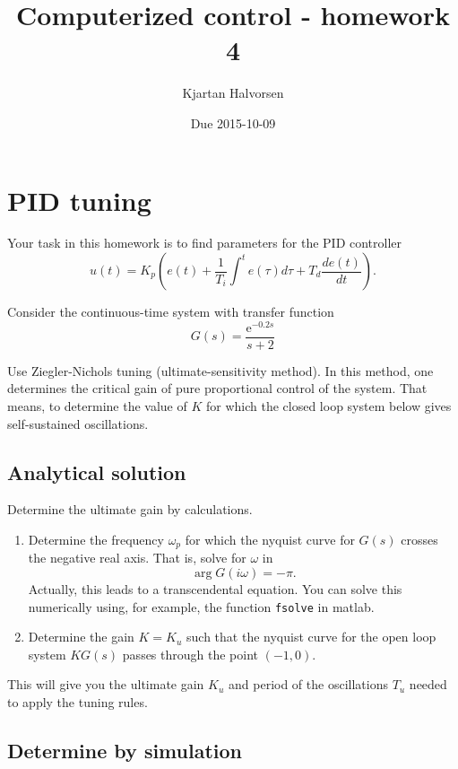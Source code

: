 \documentclass{scrartcl}
\title{Computerized control - homework 4}
\author{Kjartan Halvorsen}
\date{Due 2015-10-09}
\newcommand*{\mexp}[1]{\ensuremath{\mathrm{e}^{#1}}}
\begin{document}
\maketitle


\section{PID tuning}
\label{sec-1}

  Your task in this homework is to find parameters for the PID controller 
  \[ u(t) = K_p\left(e(t) + \frac{1}{T_i}\int^te(\tau)d\tau + T_d\frac{de(t)}{dt} \right). \]

  Consider the continuous-time system with transfer function
  \[ G(s) = \frac{\mexp{-0.2s}}{s+2} \]
  
  Use Ziegler-Nichols tuning (ultimate-sensitivity method). In this method, one determines the critical gain of pure proportional control of the system. That means, to determine the value of $K$ for which the closed loop system below gives self-sustained oscillations.
  \begin{center}
  
  \end{center}
\subsection{Analytical solution}
\label{sec-1-1}

  Determine the ultimate gain by calculations. 
\begin{enumerate}
\item Determine the frequency $\omega_p$ for which the nyquist curve for $G(s)$ crosses the negative real axis. That is, solve for $\omega$ in 
     \[ \arg G(i\omega) = -\pi. \]
     Actually, this leads to a transcendental equation. You can solve this numerically using, for example, the function \texttt{fsolve} in matlab.
\item Determine the gain $K=K_u$ such that the nyquist curve for the open loop system $KG(s)$ passes through the point $(-1,0)$.
\end{enumerate}

  This will give you the ultimate gain $K_u$ and period of the oscillations $T_u$ needed to apply the tuning rules.
\subsection{Determine by simulation}
\label{sec-1-2}
\end{document}
